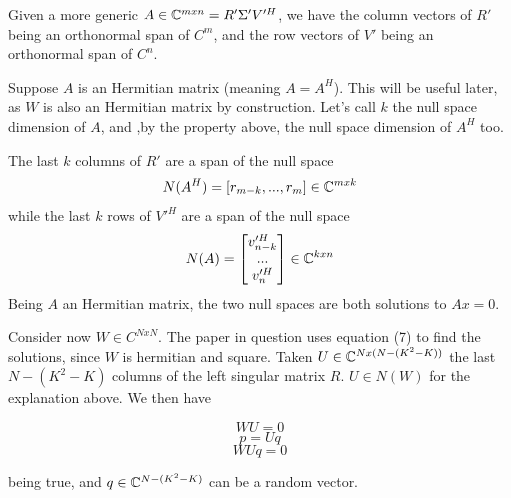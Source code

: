 Given a more generic $A \in \mathbb{C}^{mxn} = R' \Sigma' V'^H$, we have the column vectors of $R'$ being an orthonormal span of $C^m$, and the row vectors of $V'$ being an orthonormal span of $C^n$.

Suppose $A$ is an Hermitian matrix (meaning $A = A^H$). This will be useful later, as $W$ is also an Hermitian matrix by construction. Let's call $k$ the null space dimension of $A$, and ,by the property above, the null space dimension of $A^H$ too.

The last $k$ columns of $R'$ are a span of the null space
\begin{equation}
  N(A^H) = [r_{m-k}, ..., r_m ] \in \mathbb{C}^{mxk}
\end{equation}
while the last $k$ rows of $V'^H$ are a span of the null space
\begin{equation}
  N(A) = \begin{bmatrix} v'^H_{n-k} \\ ... \\ v'^H_n \end{bmatrix} \in \mathbb{C}^{kxn}
\end{equation}
Being $A$ an Hermitian matrix, the two null spaces are both solutions to $Ax = 0$.

Consider now $W \in C^{NxN}$. The paper in question uses equation (7) to find the solutions, since $W$ is hermitian and square. Taken $U \in \mathbb{C} ^ {Nx(N-(K^2 - K))}$ the last $N-(K^2 - K)$ columns of the left singular matrix $R$. $U \in N(W)$ for the explanation above. We then have

\begin{equation}WU = 0\end{equation}
\begin{equation}p = Uq\end{equation}
\begin{equation}WUq = 0\end{equation}

being true, and $q \in \mathbb{C}^{N-(K^2 - K)}$ can be a random vector.
